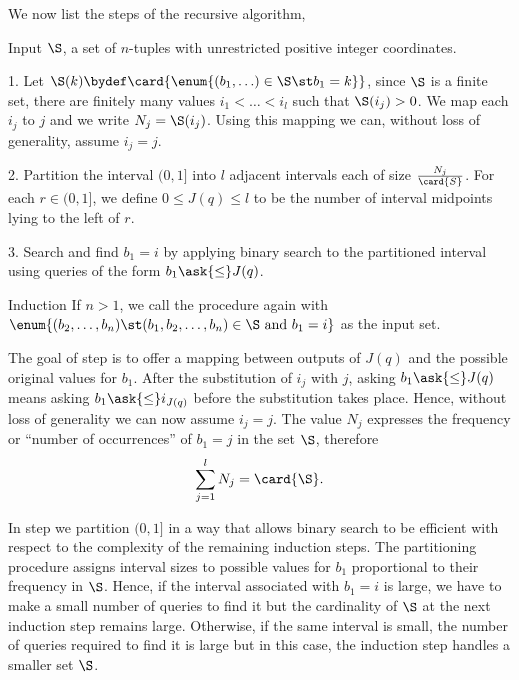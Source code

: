 We now list the steps of the recursive algorithm,
\begin{algorithm}

\item[Input] $\S$, a set of $n$-tuples with unrestricted positive integer
coordinates.

\item[1.] Let $\S(k) \bydef \card{\enum{(b_1, \ldots) \in \S \st b_1 = k}}$,
since $\S$ is a finite set, there are finitely many values $i_1 < \ldots < i_l$
such that $\S(i_j) > 0$. We map each $i_j$ to $j$
and we write $N_j = \S(i_j)$. Using this mapping we can, without loss of
generality, assume \(i_j = j\).

\item[2.] Partition the interval $(0,1]$ into $l$ adjacent intervals each of
size $\frac{N_j}{\card{S}}$. For each $r \in (0,1]$, we define $0 \le J(q) \le
l$ to be the number of interval midpoints lying to the left of $r$.

\item[3.] Search and find $b_1 = i$ by applying binary search to the partitioned
interval using queries of the form \(b_1 \ask{\le} J(q)\).

\item[Induction] If $n > 1$, we call the procedure again with\\
$\enum{(b_2, \ldots, b_n) \st (b_1, b_2, \ldots, b_n) \in \S \text{ and } b_1 =
i}$ as the input set.

\end{algorithm}

The goal of step  is to offer a mapping between outputs of $J(q)$ and
the possible original values for $b_1$. After the substitution of $i_j$ with
$j$, asking $b_1 \ask{\le} J(q)$ means asking $b_1 \ask{\le} i_{J(q)}$
before the substitution takes place. Hence, without loss of generality we can
now assume \(i_j = j\). The value $N_j$ expresses the frequency or ``number of
occurrences'' of $b_1 = j$ in the set $\S$, therefore
\begin{displaymath}
\sum\limits_{j=1}^{l} N_j = \card{\S}.
\end{displaymath}

In step  we partition $(0,1]$ in a way that allows binary search to
be efficient with respect to the complexity of the remaining induction steps.
The partitioning procedure assigns interval sizes to possible values for
$b_1$ proportional to their frequency in $\S$. Hence, if the interval
associated with $b_1 = i$ is large, we have to make a small number of
queries to find it but the cardinality of $\S$ at the next induction step
remains large. Otherwise, if the same interval is small, the number of queries
required to find it is large but in this case, the induction step
handles a smaller set \(\S\).

